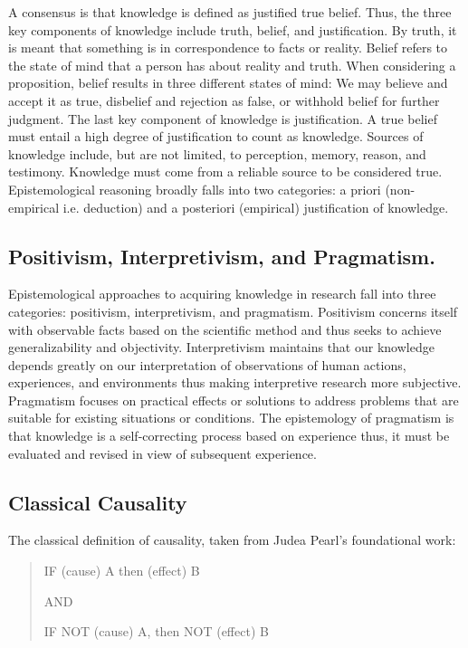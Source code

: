 \documentclass{article}
\begin{document}
A consensus is that knowledge is defined as justified true belief. Thus, the three key components of knowledge include truth, belief, and justification. By truth, it is meant that something is in correspondence to facts or reality. Belief refers to the state of mind that a person has about reality and truth.
When considering a proposition, belief results in three different states of mind: We may believe and accept it as true, disbelief and rejection as false, or withhold belief for further judgment. The last key component of knowledge is justification.
A true belief must entail a high degree of justification to count as knowledge. Sources of knowledge include, but are not limited, to perception, memory, reason, and testimony. Knowledge must come from a reliable source to be considered true. Epistemological reasoning broadly falls into two categories: a priori (non-empirical i.e. deduction) and a posteriori (empirical) justification of knowledge.


\subsection{Positivism, Interpretivism, and Pragmatism.}
\label{subsec:Def_Positivism}

Epistemological approaches to acquiring knowledge in research fall into three categories: positivism, interpretivism, and pragmatism. Positivism concerns itself with observable facts based on the scientific method and thus seeks to achieve generalizability and objectivity. Interpretivism maintains that our knowledge depends greatly on our interpretation of observations of human actions, experiences, and environments thus making interpretive research more subjective. Pragmatism focuses on practical effects or solutions to address problems that are suitable for existing situations or conditions. The epistemology of pragmatism is that knowledge is a self-correcting process based on experience thus, it must be evaluated and revised in view of subsequent experience.

\subsection{Classical Causality}
\label{subsec:Classical_Causality}

The classical definition of causality, taken from Judea Pearl's foundational work\cite{pearl2009causality}:


\begin{quote}
\begin{center}
        IF (cause) A then (effect) B

    AND 
    
    IF NOT (cause) A, then NOT (effect) B
\end{center}
\end{quote}
\end{document}
